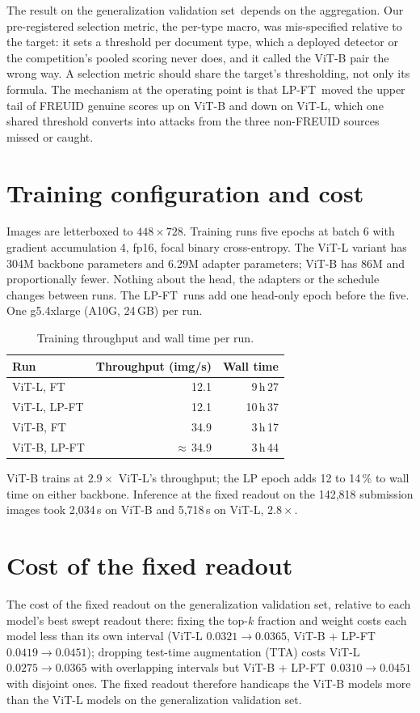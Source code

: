 \documentclass[10pt]{article}
\newcommand{\lpft}{LP-FT}
\newcommand{\genval}{generalization validation set}
\begin{document}
The result on the \genval\ depends on the aggregation. Our pre-registered selection metric, the per-type macro, was mis-specified relative to the target: it sets a threshold per document type, which a deployed detector or the competition's pooled scoring never does, and it called the ViT-B pair the wrong way. A selection metric should share the target's thresholding, not only its formula. The mechanism at the operating point is that \lpft\ moved the upper tail of FREUID genuine scores up on ViT-B and down on ViT-L, which one shared threshold converts into attacks from the three non-FREUID sources missed or caught.




\appendix
\section{Training configuration and cost}
\label{app:cost}
Images are letterboxed to $448\times728$. Training runs five epochs at batch 6 with gradient accumulation 4, fp16, focal binary cross-entropy. The ViT-L variant has 304M backbone parameters and 6.29M adapter parameters; ViT-B has 86M and proportionally fewer. Nothing about the head, the adapters or the schedule changes between runs. The \lpft\ runs add one head-only epoch before the five. One g5.4xlarge (A10G, 24\,GB) per run.

\begin{table}[h]
  \caption{Training throughput and wall time per run.}
  \centering
  \small
  \begin{tabular}{@{}lrr@{}}
    \toprule
    Run & Throughput (img/s) & Wall time \\
    \midrule
    ViT-L, FT    & 12.1 & 9\,h\,27 \\
    ViT-L, \lpft & 12.1 & 10\,h\,37 \\
    ViT-B, FT    & 34.9 & 3\,h\,17 \\
    ViT-B, \lpft & $\approx$\,34.9 & 3\,h\,44 \\
    \bottomrule
  \end{tabular}
\end{table}

ViT-B trains at $2.9\times$ ViT-L's throughput; the LP epoch adds 12 to 14\,\% to wall time on either backbone. Inference at the fixed readout on the 142,818 submission images took 2,034\,s on ViT-B and 5,718\,s on ViT-L, $2.8\times$.

\section{Cost of the fixed readout}
\label{app:readout}
The cost of the fixed readout on the \genval, relative to each model's best swept readout there: fixing the top-$k$ fraction and weight costs each model less than its own interval (ViT-L $0.0321 \to 0.0365$, ViT-B + \lpft\ $0.0419 \to 0.0451$); dropping test-time augmentation (TTA) costs ViT-L $0.0275 \to 0.0365$ with overlapping intervals but ViT-B + \lpft\ $0.0310 \to 0.0451$ with disjoint ones. The fixed readout therefore handicaps the ViT-B models more than the ViT-L models on the \genval.
\end{document}
